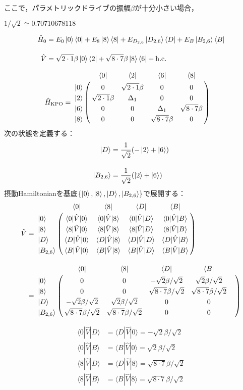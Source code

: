 ここで，パラメトリックドライブの振幅$\beta$が十分小さい場合，

$1/\sqrt{2} \simeq 0.70710678118$

\begin{align}
    \hat{H}_0 &= E_{0}\ket{0}\bra{0} + E_8 \ket{8}\bra{8} + E_{D_{2,6}} \ket{D_{2,6}}\bra{D}+ E_{B} \ket{B_{2,6}}\bra{B}\\[10pt]
    \hat{V}&= \sqrt{2\cdot1}\beta\ket{0}\bra{2} + \sqrt{8\cdot7}\beta\ket{8}\bra{6} + {\rm{h.c.}}
\end{align}


\begin{align}
     \hat{H}_{\rm{KPO}}
    &=
   \bordermatrix{     
    & \bra{0} &  \bra{2} &  \bra{6}&  \bra{8}\cr
   \ket{0}&0&\sqrt{2\cdot1}\beta&0&0\cr
  \ket{2}&\sqrt{2\cdot1}\beta&\Delta_1&0&0\cr
  \ket{6}&0&0&\Delta_1&\sqrt{8\cdot7}\beta\cr
  \ket{8}&0&0&\sqrt{8\cdot7}\beta&0\cr
            }
\end{align}
次の状態を定義する：
\begin{align}
    \ket{D} &= \frac{1}{\sqrt{2}}(-\ket{2}+\ket{6})\\[10pt]
    \ket{B_{2,6}} &= \frac{1}{\sqrt{2}}(\ket{2}+\ket{6})
\end{align}
摂動Hamiltonianを基底$\{\ket{0},\ket{8},\ket{D},\ket{B_{2,6}}\}$で展開する：
\begin{align}
     \hat{V}
    &=
   \bordermatrix{     
    & \bra{0} &  \bra{8} &  \bra{D}&  \bra{B}\cr
   \ket{0}&\langle{0|\hat{V}|0}\rangle&\langle{0|\hat{V}|8}\rangle&\langle{0|\hat{V}|D}\rangle
   &\langle{0|\hat{V}|B}\rangle\cr
  \ket{8}&\langle{8|\hat{V}|0}\rangle&\langle{8|\hat{V}|8}\rangle&\langle{8|\hat{V}|D}\rangle
   &\langle{8|\hat{V}|B}\rangle\cr
  \ket{D}&\langle{D|\hat{V}|0}\rangle&\langle{D|\hat{V}|8}\rangle&\langle{D|\hat{V}|D}\rangle
   &\langle{D|\hat{V}|B}\rangle\cr
  \ket{B_{2,6}}&\langle{B|\hat{V}|0}\rangle&\langle{B|\hat{V}|8}\rangle&\langle{B|\hat{V}|D}\rangle
   &\langle{B|\hat{V}|B}\rangle\cr
    }\\[10pt]
    &=
   \bordermatrix{     
    & \bra{0} &  \bra{8} &  \bra{D}&  \bra{B}\cr
   \ket{0}&0&0&-\sqrt{2}\beta/\sqrt{2}&\sqrt{2}\beta/\sqrt{2}\cr
  \ket{8}&0&0&\sqrt{8\cdot7}\beta/\sqrt{2}&\sqrt{8\cdot7}\beta/\sqrt{2}\cr
  \ket{D}&-\sqrt{2}\beta/\sqrt{2}&\sqrt{2}\beta/\sqrt{2}&0&0\cr
  \ket{B_{2,6}}&\sqrt{8\cdot7}\beta/\sqrt{2}&\sqrt{8\cdot7}\beta/\sqrt{2}&0&0&\cr
            }
\end{align}

\begin{align}
    \langle{0|\hat{V}|D}\rangle&=\langle{D|\hat{V}|0}\rangle=-\sqrt{2}\beta/\sqrt{2}\\[10pt]
    \langle{0|\hat{V}|B}\rangle&=\langle{B|\hat{V}|0}\rangle=\sqrt{2}\beta/\sqrt{2}\\[10pt]
    \langle{8|\hat{V}|D}\rangle&=\langle{D|\hat{V}|8}\rangle=\sqrt{8\cdot7}\beta/\sqrt{2}\\[10pt]
   \langle{8|\hat{V}|B}\rangle&=\langle{B|\hat{V}|8}\rangle=\sqrt{8\cdot7}\beta/\sqrt{2}
\end{align}


